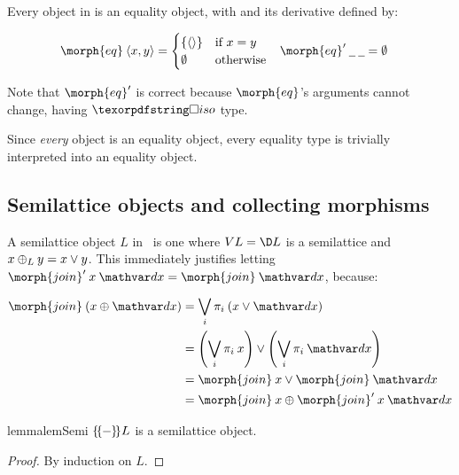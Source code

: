 Every object in \CP{} is an equality object, with  and its derivative
defined by:

\nopagebreak[2]
\begin{align*}
  \morph{eq}\<\tuple{x,y} &= 
  \begin{cases}
    \{\tuple{}\} & \text{if}~ x = y\\
    \emptyset & \text{otherwise}
  \end{cases}
  &
  \deriv{\morph{eq}} \<\pwild \<\pwild &= \emptyset
\end{align*}

\noindent Note that $\deriv{\morph{eq}}$ is correct because $\morph{eq}$'s
arguments cannot change, having $\iso$ type.

Since \emph{every} object is an equality object, every equality type
is trivially interpreted into an equality object. 


\subsection{Semilattice objects and collecting morphisms}
\label{sec:CP-semilattice}

A semilattice object $L$ in \CP\ is one where $\vals L = \chgs L$ is a
semilattice and $x \mathbin{\oplus}_L y = x \vee y$.  This immediately justifies
letting $\deriv{\morph{join}} \<x \<\dx = \morph{join}\<\dx$, because:

\nopagebreak[2]
\begin{align*}
  \morph{join}\<(x \upd \dx) &= \bigvee_i \pi_i \<(x \vee \dx)\\
  &= \left(\bigvee_i \pi_i\<x\right) \vee \left(\bigvee_i \pi_i\<\dx\right)\\
  &= \morph{join}\<x \vee \morph{join}\<\dx\\
  &= \morph{join}\<x \upd \deriv{\morph{join}}\<x\<\dx
\end{align*}

\begin{restatable}{lemma}{lemSemi}
  \label{lem:semi} $\{\kern-.18em\{\kern-.05em{-}\kern-.05em\}\kern -.18em\} L$ is a semilattice object. 
\end{restatable}
\begin{proof}
  By induction on $L$. 
\end{proof}

